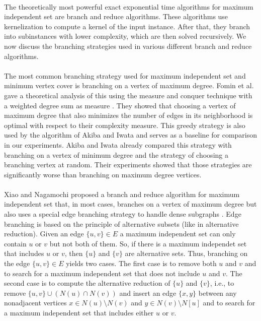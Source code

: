 \documentclass[]{article}
\begin{document}
\paragraph{}
The theoretically most powerful exact exponential time algorithms for maximum independent set are branch and reduce algorithms. These algorithms use kernelization to compute a kernel of the input instance. After that, they branch into subinstances with lower complexity, which are then solved recursively. We now discuss the branching strategies used in various different branch and reduce algorithms.

\paragraph{}
The most common branching strategy used for maximum independent set and minimum vertex cover is branching on a vertex of maximum degree. Fomin et al. gave a theoretical analysis of this using the measure and conquer technique with a weighted degree sum as measure \cite{Fomin}. They showed that choosing a vertex of maximum degree that also minimizes the number of edges in its neighborhood is optimal with respect to their complexity measure. This greedy strategy is also used by the algorithm of Akiba and Iwata\cite{AkibaIwata} and serves as a baseline for comparison in our experiments. Akiba and Iwata already compared this strategy with branching on a vertex of minimum degree and the strategy of choosing a branching vertex at random. Their experiments showed that those strategies are significantly worse than branching on maximum degree vertices.\paragraph{}
Xiao and Nagamochi proposed a branch and reduce algorithm for maximum independent set that, in most cases, branches on a vertex of maximum degree but also uses a special edge branching strategy to handle dense subgraphs \cite{XiaoNagamochi}. Edge branching is based on the principle of alternative subsets (like in alternative reduction). Given an edge $\{u,v\}\in E$ a maximum independent set can only contain $u$ or $v$ but not both of them. So, if there is a maximum independet set that includes $u$ or $v$, then $\{u\}$ and $\{v\}$ are alternative sets. Thus, branching on the edge $\{u,v\}\in E$ yields two cases. The first case is to remove both $u$ and $v$ and to search for a maximum independent set that does not include $u$ and $v$. The second case is to compute the alternative reduction of $\{u\}$ and $\{v\}$, i.e., to remove $\{u,v\}\cup(N(u)\cap N(v))$ and insert an edge $\{x,y\}$ between any nonadjacent vertices $x\in N(u)\setminus N(v)$ and $y\in N(v)\setminus N[u]$ and to search for a maximum independent set that includes either $u$ or $v$.\\
\end{document}
